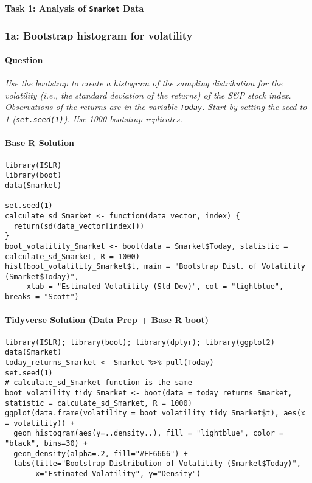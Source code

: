 \documentclass[12pt,a4paper]{article}
\newcommand{\Robject}[1]{\texttt{#1}} %
\newcommand{\Rcode}[1]{\texttt{#1}} %
\begin{document}
\textbf{\Large Task 1: Analysis of \Robject{Smarket} Data}
\vspace{0.5em}

    \subsubsection{1a: Bootstrap histogram for volatility}
        \paragraph{Question}
        \textit{Use the bootstrap to create a histogram of the sampling distribution for the volatility (i.e., the standard deviation of the returns) of the S\&P stock index. Observations of the returns are in the variable \Robject{Today}. Start by setting the seed to 1 (\Rcode{set.seed(1)}). Use 1000 bootstrap replicates.}
        \paragraph{Base R Solution}
\begin{lstlisting}[]
library(ISLR)
library(boot)
data(Smarket)

set.seed(1)
calculate_sd_Smarket <- function(data_vector, index) {
  return(sd(data_vector[index]))
}
boot_volatility_Smarket <- boot(data = Smarket$Today, statistic = calculate_sd_Smarket, R = 1000)
hist(boot_volatility_Smarket$t, main = "Bootstrap Dist. of Volatility (Smarket$Today)",
     xlab = "Estimated Volatility (Std Dev)", col = "lightblue", breaks = "Scott")
\end{lstlisting}
        \paragraph{Tidyverse Solution (Data Prep + Base R boot)}
\begin{lstlisting}[]
library(ISLR); library(boot); library(dplyr); library(ggplot2)
data(Smarket)
today_returns_Smarket <- Smarket %>% pull(Today)
set.seed(1)
# calculate_sd_Smarket function is the same
boot_volatility_tidy_Smarket <- boot(data = today_returns_Smarket, statistic = calculate_sd_Smarket, R = 1000)
ggplot(data.frame(volatility = boot_volatility_tidy_Smarket$t), aes(x = volatility)) +
  geom_histogram(aes(y=..density..), fill = "lightblue", color = "black", bins=30) +
  geom_density(alpha=.2, fill="#FF6666") +
  labs(title="Bootstrap Distribution of Volatility (Smarket$Today)",
       x="Estimated Volatility", y="Density")
\end{lstlisting}
\end{document}
